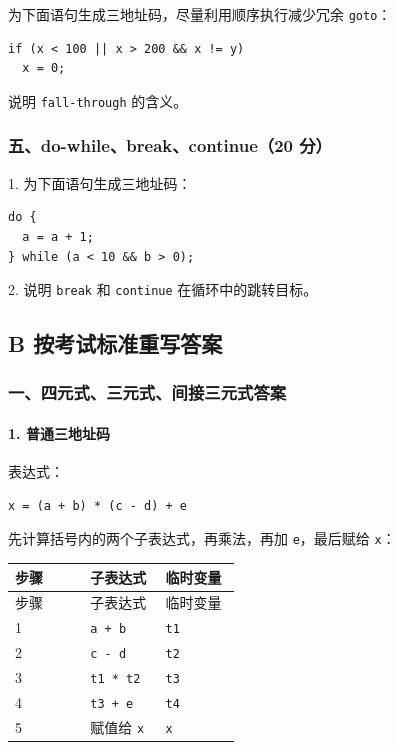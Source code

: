 \documentclass[UTF8]{ctexart}
\begin{document}
为下面语句生成三地址码，尽量利用顺序执行减少冗余 \texttt{goto}：

\begin{Verbatim}[fontsize=\small,breaklines=true]
if (x < 100 || x > 200 && x != y)
  x = 0;
\end{Verbatim}

说明 \texttt{fall-through} 的含义。

\subsubsection*{五、do-while、break、continue（20 分）}

1. 为下面语句生成三地址码：

\begin{Verbatim}[fontsize=\small,breaklines=true]
do {
  a = a + 1;
} while (a < 10 && b > 0);
\end{Verbatim}

2. 说明 \texttt{break} 和 \texttt{continue} 在循环中的跳转目标。

\subsection*{B 按考试标准重写答案}

\subsubsection*{一、四元式、三元式、间接三元式答案}

\paragraph*{1. 普通三地址码}

表达式：

\begin{Verbatim}[fontsize=\small,breaklines=true]
x = (a + b) * (c - d) + e
\end{Verbatim}

先计算括号内的两个子表达式，再乘法，再加 \texttt{e}，最后赋给 \texttt{x}：

\begin{longtable}{|p{0.31\linewidth}|p{0.31\linewidth}|p{0.31\linewidth}|}
\hline
步骤 & 子表达式 & 临时变量 \\
\hline
\endfirsthead
步骤 & 子表达式 & 临时变量 \\
\hline
\endhead
1 & \texttt{a + b} & \texttt{t1} \\
\hline
2 & \texttt{c - d} & \texttt{t2} \\
\hline
3 & \texttt{t1 * t2} & \texttt{t3} \\
\hline
4 & \texttt{t3 + e} & \texttt{t4} \\
\hline
5 & 赋值给 \texttt{x} & \texttt{x} \\
\hline
\end{longtable}
\end{document}
